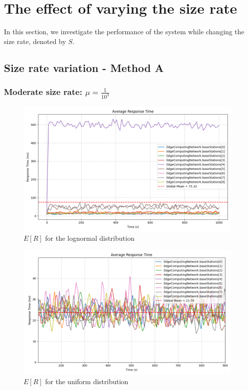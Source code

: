 \documentclass{report}
\begin{document}
\section{The effect of varying the size rate}
In this section, we investigate the performance of the system while changing the size rate, denoted by $S$. 

\subsection{Size rate variation - Method A}
\subsubsection*{Moderate size rate: $\mu=\frac{1}{10^3}$}

\begin{figure}[H]
    \centering
    \includegraphics[width=\textwidth]{img/plots/log_1e3_A/resptime.png}
    \caption{$E[R]$ for the lognormal distribution}
\end{figure}

\begin{figure}[H]
    \centering
    \includegraphics[width=\textwidth]{img/plots/uni_1e3_A/resptime.png}
    \caption{$E[R]$ for the uniform distribution}
\end{figure}
\end{document}
